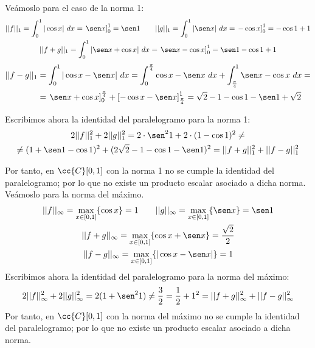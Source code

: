 \begin{ejercicio}
    Veámoslo para el caso de la norma 1:
    \begin{gather*}
        ||f||_1 = \int_0^1 |\cos x|~dx = \left.\sen x\right]_0^1 = \sen 1 \qquad
        ||g||_1 = \int_0^1 |\sen x|~dx = \left.-\cos x\right]_0^1 = -\cos 1 +1 \\
        ||f+g||_1 = \int_0^1 |\sen x +\cos x|~dx = \left.\sen x -\cos x\right]_0^1 = \sen 1 -\cos 1 +1
    \end{gather*}
    \begin{equation*}
        \begin{split}
            ||f-g||_1 &= \int_0^1 |\cos x -\sen x|~dx =\int_0^{\frac{\pi}{4}} \cos x -\sen x~dx + \int_{\frac{\pi}{4}}^1 \sen x -\cos x~dx =\\
            &= \left.\sen x +\cos x\right]_0^{\frac{\pi}{4}} + \left[-\cos x -\sen x\right]_{\frac{\pi}{4}}^1 = \sqrt{2}-1-\cos 1 -\sen 1+\sqrt{2}
        \end{split}
    \end{equation*}

    Escribimos ahora la identidad del paralelogramo para la norma 1:
    \begin{multline*}
        2||f||_1^2 + 2||g||_1^2 = 2\cdot \sen^2 1 +2\cdot (1-\cos 1)^2  \neq \\ \neq
        (1+\sen 1 -\cos 1)^2 + (2\sqrt{2}-1-\cos 1 -\sen 1)^2 = ||f+g||_1^2 + ||f-g||_1^2
    \end{multline*}

    Por tanto, en $\cc{C}[0,1]$ con la norma 1 no se cumple la identidad del paralelogramo; por lo que no existe un producto escalar asociado a dicha norma. Veámoslo para la norma del máximo.
    \begin{gather*}
        ||f||_\infty = \max_{x\in [0,1]}\{\cos x\} = 1 \qquad
        ||g||_\infty = \max_{x\in [0,1]}\{\sen x\} = \sen 1 \\
        ||f+g||_\infty = \max_{x\in [0,1]}\{\cos x + \sen x\} = \frac{\sqrt{2}}{2} \\
        ||f-g||_\infty = \max_{x\in [0,1]}\{|\cos x - \sen x|\} = 1
    \end{gather*}
    Escribimos ahora la identidad del paralelogramo para la norma del máximo:
    \begin{equation*}
        2||f||_\infty^2 + 2||g||_\infty^2 = 2(1+\sen^2 1)  \neq \frac{3}{2}=
        \frac{1}{2} + 1^2 = ||f+g||_\infty^2 + ||f-g||_\infty^2
    \end{equation*}
    Por tanto, en $\cc{C}[0,1]$ con la norma del máximo no se cumple la identidad del paralelogramo; por lo que no existe un producto escalar asociado a dicha norma.
\end{ejercicio}

